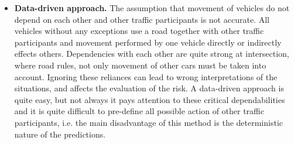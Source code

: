 \begin{itemize}
	\item \textbf{Data-driven approach.} The assumption that movement of vehicles do not depend on each other and other traffic participants is not accurate.  All vehicles without any exceptions use a road together with other traffic participants and movement performed by one vehicle directly or indirectly effects others. Dependencies with each other are quite strong at intersection, where road rules, not only movement of other cars must be taken into account. Ignoring these reliances can lead to wrong interpretations of the situations, and affects the evaluation of the risk. A data-driven approach is quite easy, but not always it pays attention to these critical dependabilities and it is quite difficult to pre-define all possible action of other traffic participants, i.e. the main disadvantage of this method is the deterministic nature of the predictions.
\end{itemize}